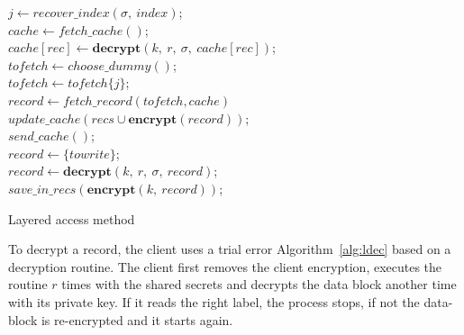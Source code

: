 \documentclass[USenglish,oneside,twocolumn]{article}
\begin{document}
\begin{algorithm}
\DontPrintSemicolon
{}
$j \gets recover\_index(\sigma,\ index)$;\\
$cache \gets fetch\_cache()$;\\
{
$cache[rec]\gets \textbf{decrypt}(k,\ r,\ \sigma,\ cache[rec])$;\\
}
{
$tofetch \gets choose\_dummy()$;\\
}
\Else
{
$tofetch \gets tofetch \{j\}$;\\
}
$record \gets fetch\_record(tofetch, cache)$\\
$update\_cache(recs \cup \textbf{encrypt}(record))$;\\
$send\_cache()$;\\

{
$record \gets \{towrite\}$;\\
}
\Else
{
$record \gets \textbf{decrypt}(k,\ r,\ \sigma,\ record)$;\\
}
$save\_in\_recs(\textbf{encrypt}(k,\ record))$;\\
\caption{Layered access method}
\label{alg:lacc}
\end{algorithm}

To decrypt a record, the client uses a trial error Algorithm~\ref{alg:ldec} based on a  decryption routine. The client first removes the client encryption, executes the routine $r$ times with the shared secrets and decrypts the data block another time with its private key. If it reads the right label, the process stops, if not the data-block is re-encrypted and it starts again.\\
\end{document}

